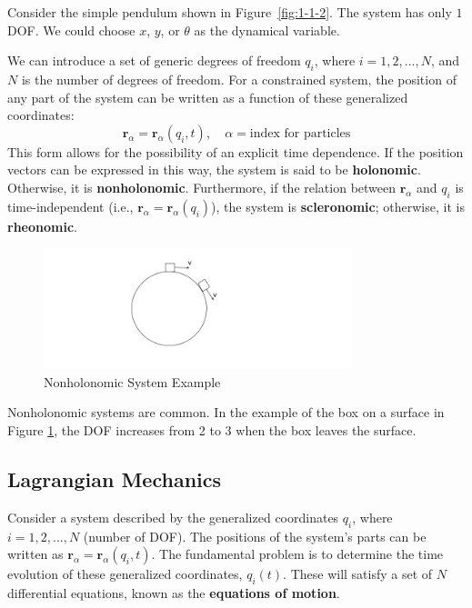 Consider the simple pendulum shown in Figure~\ref{fig:1-1-2}. The system has only $1$ DOF. We could choose $x$, $y$, or $\theta$ as the dynamical variable. 

We can introduce a set of generic degrees of freedom $q_i$, where $i = 1, 2, ..., N$, and $N$ is the number of degrees of freedom. For a constrained system, the position of any part of the system can be written as a function of these generalized coordinates:
\[
    \mathbf{r}_\alpha = \mathbf{r}_\alpha(q_i, t), \quad \alpha = \text{index for particles}
\]
This form allows for the possibility of an explicit time dependence. If the position vectors can be expressed in this way, the system is said to be \textbf{holonomic}. Otherwise, it is  \textbf{nonholonomic}.  Furthermore, if the relation between $\mathbf{r}_\alpha$ and $q_i$ is time-independent (i.e., $\mathbf{r}_\alpha = \mathbf{r}_\alpha(q_i)$), the system is \textbf{scleronomic}; otherwise, it is \textbf{rheonomic}.

\begin{figure}[ht]
  \centering
  \includegraphics[width=0.8\textwidth]{images/1-1-3.png}
  \caption{Nonholonomic System Example}
  \label{fig:1-1-3}
\end{figure}

Nonholonomic systems are common.  In the example of the box on a surface in Figure 
\ref{fig:1-1-3}, the DOF increases from 2 to 3 when the box leaves the surface.

\subsection{Lagrangian Mechanics}

Consider a system described by the generalized coordinates $q_i$, where $i = 1, 2, ..., N$ 
(number of DOF). The positions of the system's parts can be written as 
$\mathbf{r}_\alpha = \mathbf{r}_\alpha(q_i, t)$. The fundamental problem is to determine 
the time evolution of these generalized coordinates, $q_i(t)$. These will satisfy a set 
of $N$ differential equations, known as the \textbf{equations of motion}.

